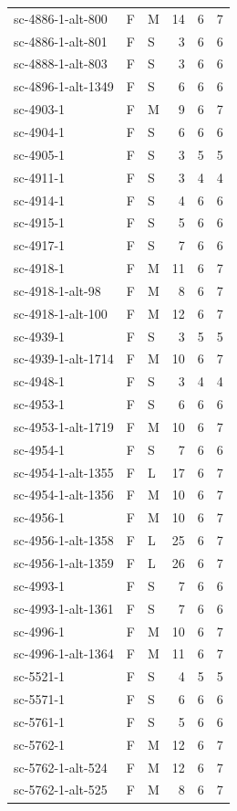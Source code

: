 \begin{longtable}{@{}p{}llrrr@{}}
sc-4886-1-alt-800 & F & M & 14 & 6 & 7\\
sc-4886-1-alt-801 & F & S & 3 & 6 & 6\\
sc-4888-1-alt-803 & F & S & 3 & 6 & 6\\
sc-4896-1-alt-1349 & F & S & 6 & 6 & 6\\
sc-4903-1 & F & M & 9 & 6 & 7\\
sc-4904-1 & F & S & 6 & 6 & 6\\
sc-4905-1 & F & S & 3 & 5 & 5\\
sc-4911-1 & F & S & 3 & 4 & 4\\
sc-4914-1 & F & S & 4 & 6 & 6\\
sc-4915-1 & F & S & 5 & 6 & 6\\
sc-4917-1 & F & S & 7 & 6 & 6\\
sc-4918-1 & F & M & 11 & 6 & 7\\
sc-4918-1-alt-98 & F & M & 8 & 6 & 7\\
sc-4918-1-alt-100 & F & M & 12 & 6 & 7\\
sc-4939-1 & F & S & 3 & 5 & 5\\
sc-4939-1-alt-1714 & F & M & 10 & 6 & 7\\
sc-4948-1 & F & S & 3 & 4 & 4\\
sc-4953-1 & F & S & 6 & 6 & 6\\
sc-4953-1-alt-1719 & F & M & 10 & 6 & 7\\
sc-4954-1 & F & S & 7 & 6 & 6\\
sc-4954-1-alt-1355 & F & L & 17 & 6 & 7\\
sc-4954-1-alt-1356 & F & M & 10 & 6 & 7\\
sc-4956-1 & F & M & 10 & 6 & 7\\
sc-4956-1-alt-1358 & F & L & 25 & 6 & 7\\
sc-4956-1-alt-1359 & F & L & 26 & 6 & 7\\
sc-4993-1 & F & S & 7 & 6 & 6\\
sc-4993-1-alt-1361 & F & S & 7 & 6 & 6\\
sc-4996-1 & F & M & 10 & 6 & 7\\
sc-4996-1-alt-1364 & F & M & 11 & 6 & 7\\
sc-5521-1 & F & S & 4 & 5 & 5\\
sc-5571-1 & F & S & 6 & 6 & 6\\
sc-5761-1 & F & S & 5 & 6 & 6\\
sc-5762-1 & F & M & 12 & 6 & 7\\
sc-5762-1-alt-524 & F & M & 12 & 6 & 7\\
sc-5762-1-alt-525 & F & M & 8 & 6 & 7\\

\end{longtable}
